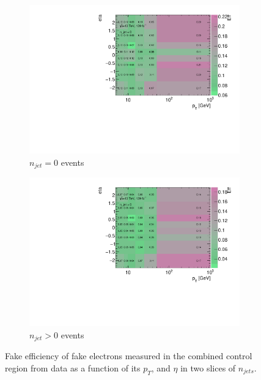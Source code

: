 \begin{figure}[htb]
    \begin{center}
        \begin{subfigure}{.48\textwidth}
            \centering
            \includegraphics[width=.95\linewidth]{figures/Analysis/Background/njet0_FakeEfficiency3D_el_pt_eta.pdf}
            \caption{$n_{jet}=0$ events \label{fig:FakeEff_3D_Elec_njet0}}
        \end{subfigure}
        \begin{subfigure}{.48\textwidth}
            \centering
            \includegraphics[width=.95\linewidth]{figures/Analysis/Background/njet1_FakeEfficiency3D_el_pt_eta.pdf}
            \caption{$n_{jet}>0$ events \label{fig:FakeEff_3D_Elec_njet1}}
        \end{subfigure}
    \end{center}
    \caption{Fake efficiency of fake electrons measured in the combined control region from data as a function of its $p_{T}$, and $\eta$ in two slices of $n_{jets}$. \label{fig:ElecFakeEff}}
\end{figure}

